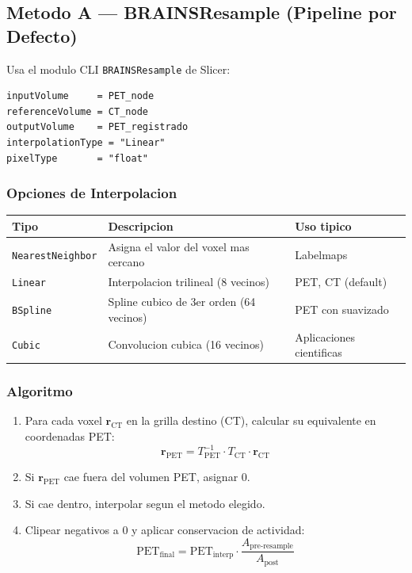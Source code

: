 \documentclass[12pt,a4paper]{article}
\begin{document}
\subsection{Metodo A --- BRAINSResample (Pipeline por Defecto)}

Usa el modulo CLI \texttt{BRAINSResample} de Slicer:

\begin{verbatim}
inputVolume     = PET_node
referenceVolume = CT_node
outputVolume    = PET_registrado
interpolationType = "Linear"
pixelType       = "float"
\end{verbatim}

\subsubsection{Opciones de Interpolacion}

\begin{table}[H]
\centering
\begin{tabular}{l l l}
\toprule
\textbf{Tipo} & \textbf{Descripcion} & \textbf{Uso tipico} \\
\midrule
\texttt{NearestNeighbor} & Asigna el valor del voxel mas cercano & Labelmaps \\
\texttt{Linear} & Interpolacion trilineal (8 vecinos) & PET, CT (default) \\
\texttt{BSpline} & Spline cubico de 3er orden (64 vecinos) & PET con suavizado \\
\texttt{Cubic} & Convolucion cubica (16 vecinos) & Aplicaciones cientificas \\
\bottomrule
\end{tabular}
\end{table}

\subsubsection{Algoritmo}

\begin{enumerate}
    \item Para cada voxel $\mathbf{r}_{\text{CT}}$ en la grilla destino (CT), calcular su
          equivalente en coordenadas PET:
          \begin{equation}\label{eq:coord_pet}
              \mathbf{r}_{\text{PET}} = T_{\text{PET}}^{-1} \cdot T_{\text{CT}} \cdot \mathbf{r}_{\text{CT}}
          \end{equation}
    \item Si $\mathbf{r}_{\text{PET}}$ cae fuera del volumen PET, asignar 0.
    \item Si cae dentro, interpolar segun el metodo elegido.
    \item Clipear negativos a 0 y aplicar conservacion de actividad:
          \begin{equation}\label{eq:act_post}
              \text{PET}_{\text{final}} = \text{PET}_{\text{interp}} \cdot \frac{A_{\text{pre-resample}}}{A_{\text{post}}}
          \end{equation}
\end{enumerate}
\end{document}
